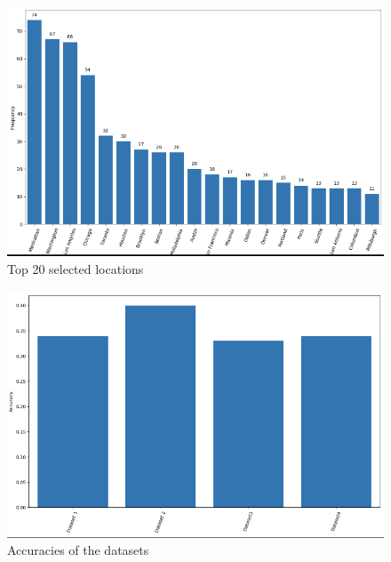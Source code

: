 \documentclass[12pt,svgnames]{report}
\begin{document}
\begin{figure}[H]
	\centering
	\includegraphics[scale = 0.5]{top20cities.png}
	\caption{Top 20 selected locations}
	\label{top20}
\end{figure}

\begin{figure}[H]
	\centering
	\includegraphics[scale = 0.5]{accuracies.png}
	\caption{Accuracies of the datasets}
	\label{accuracies}
\end{figure}



\end{document}
